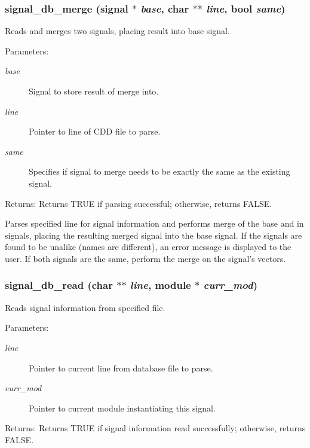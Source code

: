 \subsubsection{ signal\_\-db\_\-merge ({\bf signal} $\ast$ {\em base}, char $\ast$$\ast$ {\em line}, {\bf bool} {\em same})}\label{signal_8c_a6}


Reads and merges two signals, placing result into base signal. 

\begin{Desc}
\item[Parameters:]
\begin{description}
\item[{\em base}]Signal to store result of merge into. \item[{\em line}]Pointer to line of CDD file to parse. \item[{\em same}]Specifies if signal to merge needs to be exactly the same as the existing signal.\end{description}
\end{Desc}
\begin{Desc}
\item[Returns:]Returns TRUE if parsing successful; otherwise, returns FALSE.\end{Desc}
Parses specified line for signal information and performs merge of the base and in signals, placing the resulting merged signal into the base signal. If the signals are found to be unalike (names are different), an error message is displayed to the user. If both signals are the same, perform the merge on the signal's vectors. 
\subsubsection{ signal\_\-db\_\-read (char $\ast$$\ast$ {\em line}, {\bf module} $\ast$ {\em curr\_\-mod})}\label{signal_8c_a5}


Reads signal information from specified file. 

\begin{Desc}
\item[Parameters:]
\begin{description}
\item[{\em line}]Pointer to current line from database file to parse. \item[{\em curr\_\-mod}]Pointer to current module instantiating this signal.\end{description}
\end{Desc}
\begin{Desc}
\item[Returns:]Returns TRUE if signal information read successfully; otherwise, returns FALSE.\end{Desc}



